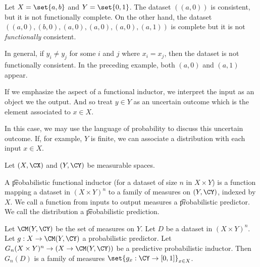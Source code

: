 

Let $X = \set{a, b}$ and $Y = \set{0, 1}$.
The dataset $((a, 0))$ is consistent, but it is not functionally complete.
On the other hand, the dataset $((a,0), (b,0), (a,0), (a,0), (a,0), (a, 1))$
is complete but it is not \textit{functionally} consistent.

In general, if $y_i \neq y_j$ for some $i$ and $j$ where $x_i = x_j$, then the dataset is not functionally consistent.
In the preceding example, both $(a, 0)$ and $(a, 1)$ appear.

If we emphasize the  aspect of a functional inductor, we interpret the input as an object we  the output.
And so treat $y \in Y$ as an uncertain outcome which is the element associated to $x \in X$.

In this case, we may use the language of probability to discuss this uncertain outcome.
If, for example, $Y$ is finite, we can associate a distribution with each input $x \in X$.


Let $(X, \CX)$ and $(Y, \CY)$ be measurable spaces.

A \t{probabilistic functional inductor} (for a dataset of size $n$ in $X \times Y$) is a function mapping a dataset in $(X \times Y)^n$ to a family of measures on $(Y, \CY)$, indexed by $X$.
We call a function from inputs to output measures a \t{probabilistic predictor}.
We call the distribution a \t{probabilistic prediction}.


Let $\CM(Y, \CY)$ be the set of measures on $Y$.
Let $D$ be a dataset in $(X \times Y)^n$.
Let $g: X \to \CM(Y, \CY)$  a probabilistic predictor.
Let $G_n (X \times Y)^n \to (X \to \CM(Y, \CY))$ be a predictive probabilistic inductor.
Then $G_n(D)$ is a family of measures $\set{g_x: \CY \to [0, 1]}_{x \in X}$.


